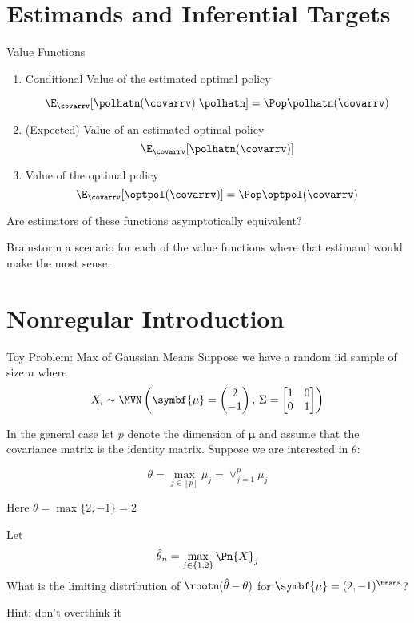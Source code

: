 \documentclass[aspectratio=169, professionalfonts]{beamer}
\begin{document}
\section{Estimands and Inferential Targets}

\begin{frame}{Value Functions}
	\begin{enumerate}
		\item Conditional Value of the estimated optimal policy

		      $$\E_{\covarrv}[\polhatn(\covarrv) \vert \polhatn] = \Pop \polhatn(\covarrv)$$

		\item (Expected) Value of an estimated optimal policy
		      $$\E_{\covarrv}[\polhatn(\covarrv)]$$

		\item Value of the optimal policy
		      $$\E_{\covarrv}[\optpol(\covarrv)] = \Pop \optpol(\covarrv)$$
	\end{enumerate}

	\vfill \pause

	Are estimators of these functions asymptotically equivalent?

	\vfill \pause
	Brainstorm a scenario for each of the value functions where that estimand would
	make the most sense.
\end{frame}

\section{Nonregular Introduction}
\begin{frame}{Toy Problem: Max of Gaussian Means}
	Suppose we have a random iid sample of size $n$ where
	\begin{equation*}
		X_i \sim \MVN \left(\symbf{\mu} = \begin{pmatrix}2 \\ -1 \end{pmatrix},\, \Sigma = \begin{bmatrix}1 & 0
               \\ 0 & 1\end{bmatrix} \right)
	\end{equation*}

	\vfill
	\pause

	In the general case let $p$ denote the dimension of $\symbf{\mu}$ and assume that
	the covariance matrix is the identity matrix. Suppose we are interested in $\theta$:

	$$\theta = \max_{j \in
			[p]} \mu_j = \displaystyle \lor_{j = 1}^{p} \mu_j$$
	\vfill

	Here $\theta = \max \{2, -1\} = 2$

	\vfill
	\pause
	Let $$\hat{\theta}_n = \max_{j \in \{1, 2 \}} \Pn {X}_j $$
	\vfill
	\pause
	What is the limiting distribution of $\rootn (\hat{\theta} - \theta)$ for $\symbf{\mu} =
		(2, -1 )^{\trans}$?

	Hint: don't overthink it
\end{frame}
\end{document}
